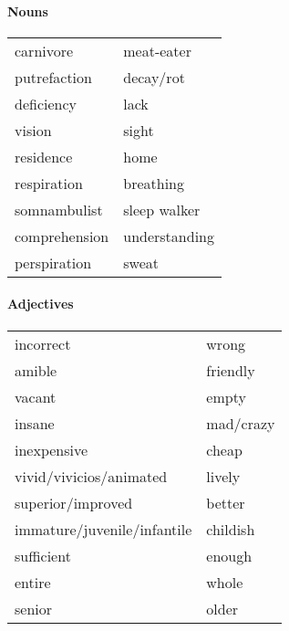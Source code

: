 \paragraph{Nouns}
\begin{tabular}{l l}
carnivore & meat-eater\\
putrefaction & decay/rot\\
deficiency & lack\\
vision & sight\\
residence & home\\
respiration & breathing\\
somnambulist & sleep walker\\
comprehension & understanding\\
perspiration & sweat
\end{tabular}

\paragraph{Adjectives}
\begin{tabular}{l l}
incorrect & wrong\\
amible & friendly\\
vacant & empty\\
insane & mad/crazy\\
inexpensive & cheap\\
vivid/vivicios/animated & lively\\
superior/improved & better\\
immature/juvenile/infantile & childish\\
sufficient & enough\\
entire & whole\\
senior & older
\end{tabular}

